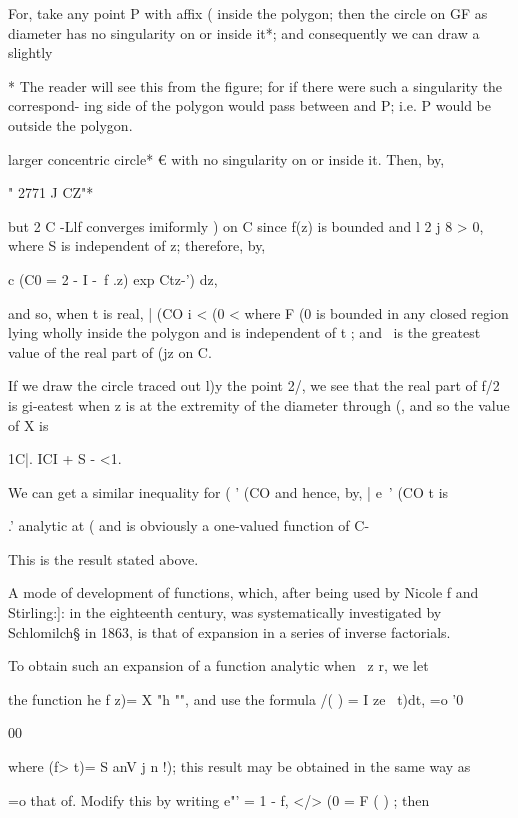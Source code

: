 For, take any point P with affix ( inside the polygon; then the circle
on GF as diameter has no singularity on or inside it*; and
consequently we can draw a slightly

* The reader will see this from the figure; for if there were such a
singularity the correspond- ing side of the polygon would pass between
and P; i.e. P would be outside the polygon.
%
%

larger concentric circle* € with no singularity on or inside it. Then,
by,

" 2771 J CZ"*

but 2 C -Llf converges imiformly ) on C since f(z) is bounded
and l 2 j 8 > 0, where S is independent of z; therefore, by,

c (C0 = 2 - I -\ f .z) exp Ctz-') dz,

and so, when t is real, | (CO i < (0 < where F (0 is bounded in any
closed region lying wholly inside the polygon and is independent of t
; and \ is the greatest value of the real part of (jz on C.

If we draw the circle traced out l)y the point 2/, we see that the
real part of f/2 is gi-eatest when z is at the extremity of the
diameter through (, and so the value of X is

1C|. ICI + S - <1.

We can get a similar inequality for ( ' (CO and hence, by, |
e~' (CO t is

.' analytic at ( and is obviously a one-valued function of C-

This is the result stated above.

A mode of development of functions, which, after being used by Nicole
f and Stirling:]: in the eighteenth century, was systematically
investigated by Schlomilch§ in 1863, is that of expansion in a series
of inverse factorials.

To obtain such an expansion of a function analytic when \ z r, we let

the function he f z)= X "h "", and use the formula /( ) = I ze~ t)dt,
=o '0

00

where (f> t)= S anV j n !); this result may be obtained in the same
way as

 =o that of. Modify this by writing e"' = 1 - f, </> (0 = F ( )
; then

